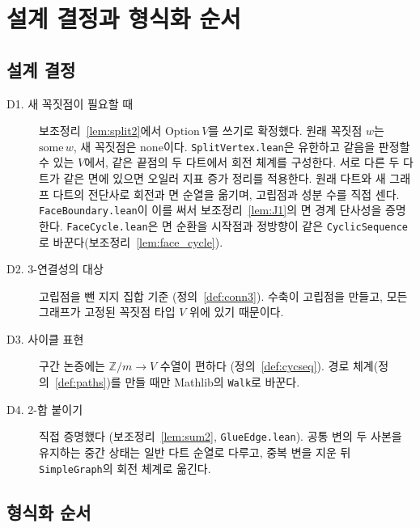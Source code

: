 \chapter{설계 결정과 형식화 순서}
\label{chap:plan}

\section{설계 결정}

\begin{description}
  \item[D1. 새 꼭짓점이 필요할 때] 보조정리~\ref{lem:split2}에서 \(\mathrm{Option}\,V\)를 쓰기로 확정했다.
    원래 꼭짓점 \(w\)는 \(\mathrm{some}\,w\), 새 꼭짓점은 \(\mathrm{none}\)이다.
    \texttt{SplitVertex.lean}은 유한하고 같음을 판정할 수 있는 \(V\)에서, 같은 끝점의 두 다트에서
    회전 체계를 구성한다. 서로 다른 두 다트가 같은 면에 있으면 오일러 지표 증가 정리를 적용한다. 원래 다트와 새 그래프 다트의 전단사로 회전과
    면 순열을 옮기며, 고립점과 성분 수를 직접 센다. \texttt{FaceBoundary.lean}이 이를 써서
    보조정리~\ref{lem:J1}의 면 경계 단사성을 증명한다. \texttt{FaceCycle.lean}은 면 순환을
    시작점과 정방향이 같은 \texttt{CyclicSequence}로 바꾼다(보조정리~\ref{lem:face_cycle}).
  \item[D2. 3-연결성의 대상] 고립점을 뺀 지지 집합 기준 (정의~\ref{def:conn3}). 수축이 고립점을 만들고,
    모든 그래프가 고정된 꼭짓점 타입 \(V\) 위에 있기 때문이다.
  \item[D3. 사이클 표현] 구간 논증에는 \(\mathbb{Z}/m \to V\) 수열이 편하다 (정의~\ref{def:cycseq}). 경로
    체계(정의~\ref{def:paths})를 만들 때만 Mathlib의 \texttt{Walk}로 바꾼다.
  \item[D4. 2-합 붙이기] 직접 증명했다 (보조정리~\ref{lem:sum2}, \texttt{GlueEdge.lean}).
    공통 변의 두 사본을 유지하는 중간 상태는 일반 다트 순열로 다루고, 중복 변을 지운 뒤
    \texttt{SimpleGraph}의 회전 체계로 옮긴다.
\end{description}

\section{형식화 순서}

